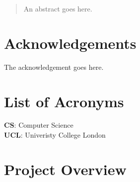 \documentclass[fontsize=11pt]{extarticle}
\numberwithin{figure}{section} %
\numberwithin{table}{section}%
\begin{document}

\newpage



\begin{abstract}
  An abstract goes here.

\end{abstract}
\newpage

\section*{Acknowledgements}\label{acknowledgements}
The acknowledgement goes here.
\newpage

\tableofcontents
%
%
\newpage

\listoftables
{}
\listoffigures

\newpage

\section*{List of Acronyms}\label{acronyms}
\textbf{CS}: Computer Science \\
\textbf{UCL}: Univeristy College London \\



\newpage

\clearpage
{}
\hypertarget{project-overview}{%
\section{Project Overview}\label{project-overview}}
\end{document}
